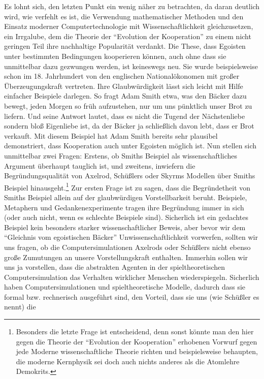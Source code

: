 \documentclass[12pt,a4paper,ngerman]{article}
\begin{document}
Es lohnt sich, den letzten Punkt ein wenig näher zu betrachten, da
daran deutlich wird, wie verfehlt es ist, die Verwendung
mathematischer Methoden und den Einsatz moderner Computertechnologie
mit Wissenschaftlichkeit gleichzusetzen, ein Irrgalube, dem die
Theorie der "`Evolution der Kooperation"' zu einem nicht geringen Teil
ihre nachhaltige Popularität verdankt. Die These, dass Egoisten unter
bestimmten Bedingungen kooperieren können, auch ohne dass sie
unmittelbar dazu gezwungen werden, ist keineswegs neu. Sie wurde
beispielsweise schon im 18. Jahrhundert von den englischen
Nationalökonomen mit großer Überzeugungskraft vertreten.  Ihre
Glaubwürdigkeit lässt sich leicht mit Hilfe einfacher Beispiele
darlegen.  So fragt Adam Smith etwa, was den Bäcker dazu bewegt, jeden
Morgen so früh aufzustehen, nur um uns pünktlich unser Brot zu
liefern. Und seine Antwort lautet, dass es nicht die Tugend der
Nächstenliebe sondern bloß Eigenliebe ist, da der Bäcker ja
schließlich davon lebt, dass er Brot verkauft. Mit diesem Beispiel hat
Adam Smith bereits sehr plausibel demonstriert, dass Kooperation auch
unter Egoisten möglich ist. Nun stellen sich unmittelbar zwei Fragen:
Erstens, ob Smiths Beispiel als wissenschaftliches Argument überhaupt
tauglich ist, und zweitens, inwiefern die Begründungsqualität von
Axelrod, Schüßlers oder Skyrms Modellen über Smiths Beispiel
hinausgeht.\footnote{Besonders die letzte Frage ist entscheidend, denn
  sonst könnte man den hier gegen die Theorie der "`Evolution der
  Kooperation"' erhobenen Vorwurf gegen jede Moderne wissenschaftliche
  Theorie richten und beispielsweise behaupten, die moderne Kernphysik
  sei doch auch nichts anderes als die Atomlehre Demokrits.} Zur
ersten Frage ist zu sagen, dass die Begründetheit von Smiths Beispiel
allein auf der glaubwürdigen Vorstellbarkeit beruht. Beispiele,
Metaphern und Gedankenexperimente tragen ihre Begründung immer in sich
(oder auch nicht, wenn es schlechte Beispiele sind). Sicherlich ist
ein gedachtes Beispiel kein besonders starker wissenschaftlicher
Beweis, aber bevor wir dem "`Gleichnis vom egoistischen Bäcker"'
Unwissenschaftlichkeit vorwerfen, sollten wir uns fragen, ob die
Computersimulationen Axelrods oder Schüßlers nicht ebenso große
Zumutungen an unsere Vorstellungskraft enthalten. Immerhin sollen wir
uns ja vorstellen, dass die abstrakten Agenten in der
spieltheoretischen Computersimulation das Verhalten wirklicher
Menschen wiederspiegeln. Sicherlich haben Computersimulationen und
spieltheoretische Modelle, dadurch dass sie formal bzw. rechnerisch
ausgeführt sind, den Vorteil, dass sie uns (wie Schüßler es nennt) die
\end{document}
